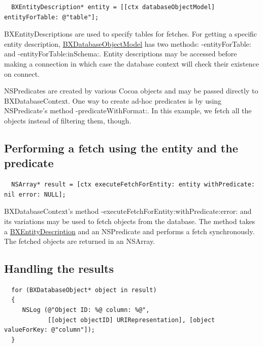   \begin{lstlisting}
  BXEntityDescription* entity = [[ctx databaseObjectModel] entityForTable: @"table"];
  \end{lstlisting}
   

B\+X\+Entity\+Descriptions are used to specify tables for fetches. For getting a specific entity description, \hyperlink{interface_b_x_database_object_model}{B\+X\+Database\+Object\+Model} has two methods\+: -\/entity\+For\+Table\+: and -\/entity\+For\+Table\+:in\+Schema\+:. Entity descriptions may be accessed before making a connection in which case the database context will check their existence on connect.

N\+S\+Predicates are created by various Cocoa objects and may be passed directly to B\+X\+Database\+Context. One way to create ad-\/hoc predicates is by using N\+S\+Predicate's method -\/predicate\+With\+Format\+:. In this example, we fetch all the objects instead of filtering them, though.\hypertarget{getting_started_performing_a_fetch}{}\subsection{Performing a fetch using the entity and the predicate}\label{getting_started_performing_a_fetch}
 
  \begin{lstlisting}
  NSArray* result = [ctx executeFetchForEntity: entity withPredicate: nil error: NULL];
  \end{lstlisting}
   

B\+X\+Database\+Context's method -\/execute\+Fetch\+For\+Entity\+:with\+Predicate\+:error\+: and its variations may be used to fetch objects from the database. The method takes a \hyperlink{interface_b_x_entity_description}{B\+X\+Entity\+Description} and an N\+S\+Predicate and performs a fetch synchronously. The fetched objects are returned in an N\+S\+Array.\hypertarget{getting_started_handling_the_results}{}\subsection{Handling the results}\label{getting_started_handling_the_results}
 
  \begin{lstlisting}
  for (BXDatabaseObject* object in result)
  {
     NSLog (@"Object ID: %@ column: %@", 
            [[object objectID] URIRepresentation], [object valueForKey: @"column"]);
  } 
  \end{lstlisting}
   

